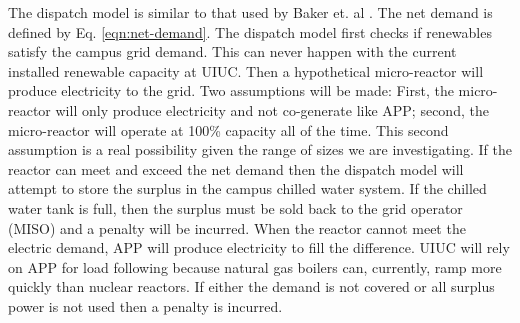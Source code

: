 The dispatch model is similar to that used by Baker et. al \cite{baker_optimal_2018}. The net demand is defined by 
Eq. \ref{eqn:net-demand}. The dispatch model first checks if renewables satisfy the campus grid demand. This can never happen with the current installed renewable capacity at UIUC. Then a hypothetical micro-reactor will produce electricity to the grid. Two assumptions will be made: First, the micro-reactor will only produce electricity and not co-generate like APP; second, the micro-reactor will operate at 100\% capacity all of the time. This second assumption is a real possibility given the range of sizes we are investigating. If the reactor can meet and exceed the net demand then the dispatch model will attempt to store the surplus in the campus chilled water system. If the chilled water tank is full, then the surplus must be sold back to the grid operator (MISO) and a penalty will be incurred. When the reactor cannot meet the electric demand, APP will produce electricity to fill the difference. UIUC will rely on APP for load following because natural gas boilers can, currently, ramp more quickly than nuclear reactors. If either the demand is not covered or all surplus power is not used then a penalty is incurred.
